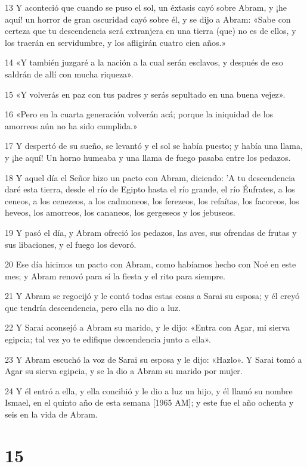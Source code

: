 \par 13 Y aconteció que cuando se puso el sol, un éxtasis cayó sobre Abram, y ¡he aquí! un horror de gran oscuridad cayó sobre él, y se dijo a Abram: «Sabe con certeza que tu descendencia será extranjera en una tierra (que) no es de ellos, y los traerán en servidumbre, y los afligirán cuatro cien años.»
\par 14 «Y también juzgaré a la nación a la cual serán esclavos, y después de eso saldrán de allí con mucha riqueza».
\par 15 «Y volverás en paz con tus padres y serás sepultado en una buena vejez».
\par 16 «Pero en la cuarta generación volverán acá; porque la iniquidad de los amorreos aún no ha sido cumplida.»
\par 17 Y despertó de su sueño, se levantó y el sol se había puesto; y había una llama, y ​​¡he aquí! Un horno humeaba y una llama de fuego pasaba entre los pedazos.
\par 18 Y aquel día el Señor hizo un pacto con Abram, diciendo: 'A tu descendencia daré esta tierra, desde el río de Egipto hasta el río grande, el río Éufrates, a los ceneos, a los cenezeos, a los cadmoneos, los ferezeos, los refaítas, los facoreos, los heveos, los amorreos, los cananeos, los gergeseos y los jebuseos.
\par 19 Y pasó el día, y Abram ofreció los pedazos, las aves, sus ofrendas de frutas y sus libaciones, y el fuego los devoró.
\par 20 Ese día hicimos un pacto con Abram, como habíamos hecho con Noé en este mes; y Abram renovó para sí la fiesta y el rito para siempre.
\par 21 Y Abram se regocijó y le contó todas estas cosas a Sarai su esposa; y él creyó que tendría descendencia, pero ella no dio a luz.
\par 22 Y Sarai aconsejó a Abram su marido, y le dijo: «Entra con Agar, mi sierva egipcia; tal vez yo te edifique descendencia junto a ella».
\par 23 Y Abram escuchó la voz de Sarai su esposa y le dijo: «Hazlo». Y Sarai tomó a Agar su sierva egipcia, y se la dio a Abram su marido por mujer.
\par 24 Y él entró a ella, y ella concibió y le dio a luz un hijo, y él llamó su nombre Ismael, en el quinto año de esta semana [1965 AM]; y este fue el año ochenta y seis en la vida de Abram.

\chapter{15}

